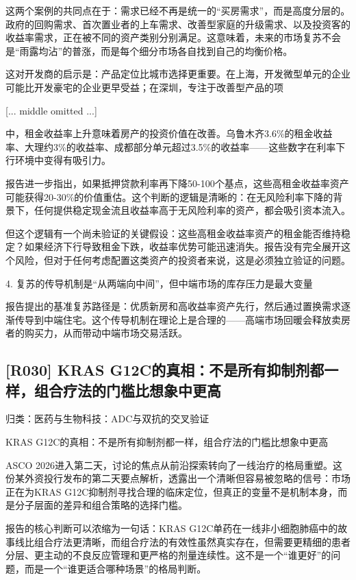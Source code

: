 \documentclass[11pt]{ctexart}
\begin{document}
这两个案例的共同点在于：需求已经不再是统一的“买房需求”，而是高度分层的。政府的回购需求、首次置业者的上车需求、改善型家庭的升级需求、以及投资客的收益率需求，正在被不同的资产类别分别满足。这意味着，未来的市场复苏不会是“雨露均沾”的普涨，而是每个细分市场各自找到自己的均衡价格。

这对开发商的启示是：产品定位比城市选择更重要。在上海，开发微型单元的企业可能比开发豪宅的企业更早受益；在深圳，专注于改善型产品的项

[... middle omitted ...]

中，租金收益率上升意味着房产的投资价值在改善。乌鲁木齐3.6\%的租金收益率、大理约3\%的收益率、成都部分单元超过3.5\%的收益率——这些数字在利率下行环境中变得有吸引力。

报告进一步指出，如果抵押贷款利率再下降50-100个基点，这些高租金收益率资产可能获得20-30\%的价值重估。这个判断的逻辑是清晰的：在无风险利率下降的背景下，任何提供稳定现金流且收益率高于无风险利率的资产，都会吸引资本流入。

但这个逻辑有一个尚未验证的关键假设：这些高租金收益率资产的租金能否维持稳定？如果经济下行导致租金下跌，收益率优势可能迅速消失。报告没有完全展开这个风险，但对于任何考虑配置这类资产的投资者来说，这是必须独立验证的问题。

4. 复苏的传导机制是“从两端向中间”，但中端市场的库存压力是最大变量

报告提出的基准复苏路径是：优质新房和高收益率资产先行，然后通过置换需求逐渐传导到中端住宅。这个传导机制在理论上是合理的——高端市场回暖会释放卖房者的购买力，从而带动中端市场交易活跃。

\subsection{[R030] KRAS G12C的真相：不是所有抑制剂都一样，组合疗法的门槛比想象中更高}
{\small\color{refgray}归类：医药与生物科技：ADC与双抗的交叉验证}

KRAS G12C的真相：不是所有抑制剂都一样，组合疗法的门槛比想象中更高

ASCO 2026进入第二天，讨论的焦点从前沿探索转向了一线治疗的格局重塑。这份某外资投行发布的第二天要点解析，透露出一个清晰但容易被忽略的信号：市场正在为KRAS G12C抑制剂寻找合理的临床定位，但真正的变量不是机制本身，而是分子层面的差异和组合策略的选择门槛。

报告的核心判断可以浓缩为一句话：KRAS G12C单药在一线非小细胞肺癌中的故事线比组合疗法更清晰，而组合疗法的有效性虽然真实存在，但需要更精细的患者分层、更主动的不良反应管理和更严格的剂量连续性。这不是一个“谁更好”的问题，而是一个“谁更适合哪种场景”的格局判断。
\end{document}
